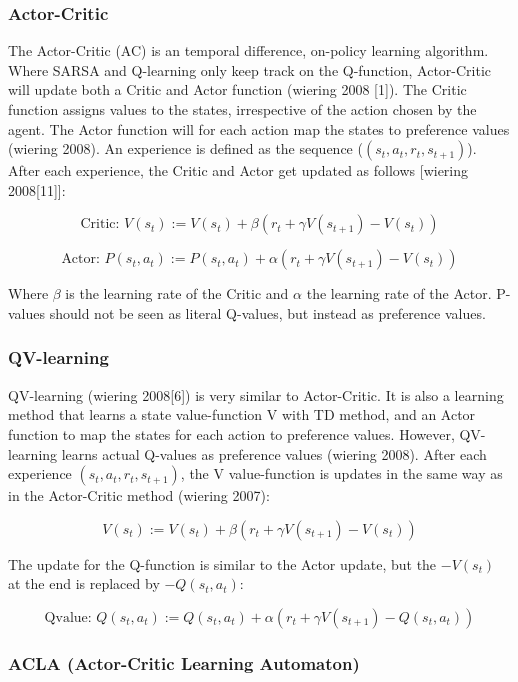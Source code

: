\hypertarget{actor-critic}{%
\subsubsection{Actor-Critic}\label{actor-critic}}

The Actor-Critic (AC) is an temporal difference, on-policy learning
algorithm. Where SARSA and Q-learning only keep track on the Q-function,
Actor-Critic will update both a Critic and Actor function (wiering 2008
{[}1{]}). The Critic function assigns values to the states, irrespective
of the action chosen by the agent. The Actor function will for each
action map the states to preference values (wiering 2008). An experience
is defined as the sequence (\((s_t, a_t, r_t, s_{t+1})\)). After each
experience, the Critic and Actor get updated as follows {[}wiering
2008{[}11{]}{]}:

\[ \text{Critic: } V(s_t) := V(s_t) + \beta ( r_t + \gamma V(s_{t+1}) - V(s_t) ) \]

\[ \text{Actor: } P(s_t, a_t) := P(s_t, a_t) + \alpha ( r_t + \gamma V(s_{t+1}) - V(s_t) ) \]

Where \(\beta\) is the learning rate of the Critic and \(\alpha\) the
learning rate of the Actor. P-values should not be seen as literal
Q-values, but instead as preference values.

\hypertarget{qv-learning}{%
\subsubsection{QV-learning}\label{qv-learning}}

QV-learning (wiering 2008{[}6{]}) is very similar to Actor-Critic. It is
also a learning method that learns a state value-function V with TD
method, and an Actor function to map the states for each action to
preference values. However, QV-learning learns actual Q-values as
preference values (wiering 2008). After each experience
\((s_t, a_t, r_t, s_{t+1})\), the V value-function is updates in the
same way as in the Actor-Critic method (wiering 2007):

\[ V(s_t) := V(s_t) + \beta ( r_t + \gamma V(s_{t+1}) - V(s_t) )   \]

The update for the Q-function is similar to the Actor update, but the
\(- V(s_t)\) at the end is replaced by \(- Q(s_t, a_t)\):

\[ \text{Qvalue: } Q(s_t, a_t) := Q(s_t, a_t) + \alpha ( r_t + \gamma V(s_{t+1}) - Q(s_t, a_t))\]

\hypertarget{acla-actor-critic-learning-automaton}{%
\subsubsection{ACLA (Actor-Critic Learning
Automaton)}\label{acla-actor-critic-learning-automaton}}

